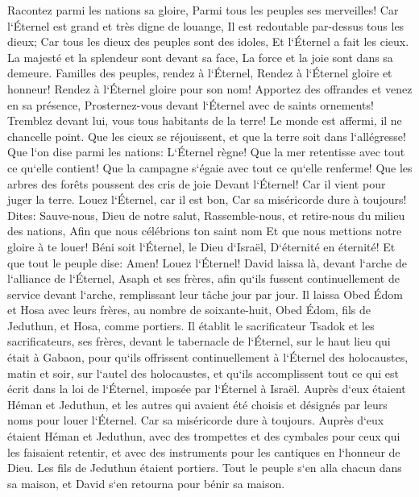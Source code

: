 \verse Racontez parmi les nations sa gloire, Parmi tous les peuples ses merveilles! 
\verse Car l`Éternel est grand et très digne de louange, Il est redoutable par-dessus tous les dieux; 
\verse Car tous les dieux des peuples sont des idoles, Et l`Éternel a fait les cieux. 
\verse La majesté et la splendeur sont devant sa face, La force et la joie sont dans sa demeure. 
\verse Familles des peuples, rendez à l`Éternel, Rendez à l`Éternel gloire et honneur! 
\verse Rendez à l`Éternel gloire pour son nom! Apportez des offrandes et venez en sa présence, Prosternez-vous devant l`Éternel avec de saints ornements! 
\verse Tremblez devant lui, vous tous habitants de la terre! Le monde est affermi, il ne chancelle point. 
\verse Que les cieux se réjouissent, et que la terre soit dans l`allégresse! Que l`on dise parmi les nations: L`Éternel règne! 
\verse Que la mer retentisse avec tout ce qu`elle contient! Que la campagne s`égaie avec tout ce qu`elle renferme! 
\verse Que les arbres des forêts poussent des cris de joie Devant l`Éternel! Car il vient pour juger la terre. 
\verse Louez l`Éternel, car il est bon, Car sa miséricorde dure à toujours! 
\verse Dites: Sauve-nous, Dieu de notre salut, Rassemble-nous, et retire-nous du milieu des nations, Afin que nous célébrions ton saint nom Et que nous mettions notre gloire à te louer! 
\verse Béni soit l`Éternel, le Dieu d`Israël, D`éternité en éternité! Et que tout le peuple dise: Amen! Louez l`Éternel! 
\verse David laissa là, devant l`arche de l`alliance de l`Éternel, Asaph et ses frères, afin qu`ils fussent continuellement de service devant l`arche, remplissant leur tâche jour par jour. 
\verse Il laissa Obed Édom et Hosa avec leurs frères, au nombre de soixante-huit, Obed Édom, fils de Jeduthun, et Hosa, comme portiers. 
\verse Il établit le sacrificateur Tsadok et les sacrificateurs, ses frères, devant le tabernacle de l`Éternel, sur le haut lieu qui était à Gabaon, 
\verse pour qu`ils offrissent continuellement à l`Éternel des holocaustes, matin et soir, sur l`autel des holocaustes, et qu`ils accomplissent tout ce qui est écrit dans la loi de l`Éternel, imposée par l`Éternel à Israël. 
\verse Auprès d`eux étaient Héman et Jeduthun, et les autres qui avaient été choisis et désignés par leurs noms pour louer l`Éternel. Car sa miséricorde dure à toujours. 
\verse Auprès d`eux étaient Héman et Jeduthun, avec des trompettes et des cymbales pour ceux qui les faisaient retentir, et avec des instruments pour les cantiques en l`honneur de Dieu. Les fils de Jeduthun étaient portiers. 
\verse Tout le peuple s`en alla chacun dans sa maison, et David s`en retourna pour bénir sa maison. 

